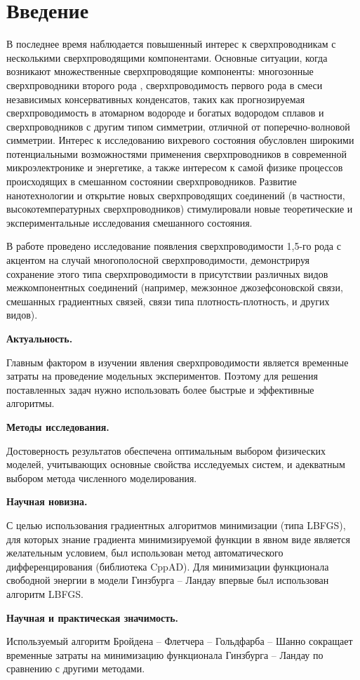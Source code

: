\chapter*{Введение}

В последнее время наблюдается повышенный интерес к сверхпроводникам с 
несколькими сверхпроводящими компонентами. Основные ситуации, когда возникают 
множественные сверхпроводящие компоненты: многозонные сверхпроводники второго 
рода \cite{bib:6,bib:7,bib:8,bib:9,bib:10,bib:11}, сверхпроводимость первого 
рода в смеси независимых консервативных конденсатов, таких как прогнозируемая 
сверхпроводимость в атомарном водороде и богатых водородом сплавов 
\cite{bib:12.1,bib:12.2,bib:13,bib:14} и сверхпроводников с другим типом 
симметрии, отличной от поперечно-волновой симметрии. Интерес к исследованию 
вихревого состояния обусловлен широкими потенциальными возможностями 
применения сверхпроводников в современной микроэлектронике и энергетике, а 
также интересом к самой физике процессов происходящих в смешанном состоянии 
сверхпроводников. Развитие нанотехнологии и открытие новых сверхпроводящих 
соединений (в частности, высокотемпературных сверхпроводников) стимулировали 
новые теоретические и экспериментальные исследования смешанного состояния. 

В работе проведено исследование появления сверхпроводимости 1,5-го рода с 
акцентом на случай многополосной сверхпроводимости, демонстрируя сохранение 
этого типа сверхпроводимости в присутствии различных видов межкомпонентных 
соединений (например, межзонное джозефсоновской связи, смешанных градиентных 
связей, связи типа плотность-плотность, и других видов).

\textbf{Актуальность.}

Главным фактором в изучении явления сверхпроводимости является временные 
затраты на проведение модельных экспериментов. Поэтому для решения 
поставленных задач нужно использовать более быстрые и эффективные алгоритмы.

\textbf{Методы исследования.}

Достоверность результатов обеспечена оптимальным выбором физических моделей, 
учитывающих основные свойства исследуемых систем, и адекватным выбором метода 
численного моделирования.

\textbf{Научная новизна.}

С целью использования градиентных алгоритмов минимизации (типа LBFGS), для 
которых знание градиента минимизируемой функции в явном виде является 
желательным условием, был использован метод автоматического дифференцирования 
(библиотека CppAD). Для минимизации функционала свободной энергии в модели 
Гинзбурга -- Ландау впервые был использован алгоритм LBFGS.

\textbf{Научная и практическая значимость.}

Используемый алгоритм Бройдена -- Флетчера -- Гольдфарба -- Шанно сокращает
временные затраты на минимизацию функционала Гинзбурга -- Ландау по сравнению 
с другими методами.

\newpage